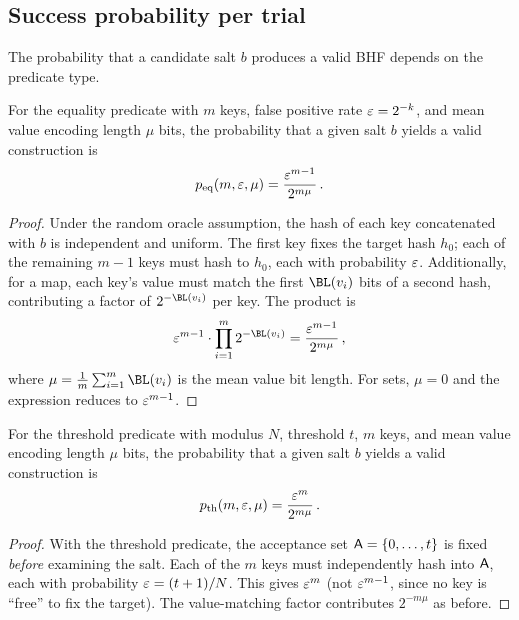 \subsection{Success probability per trial}

The probability that a candidate salt $b$ produces a valid BHF depends on the
predicate type.

\begin{theorem}
\label{thm:success_eq}
For the equality predicate with $m$ keys, false positive rate
$\varepsilon = 2^{-k}$, and mean value encoding length $\mu$ bits, the probability
that a given salt $b$ yields a valid construction is
\begin{equation}
    p_{\mathrm{eq}}(m, \varepsilon, \mu) = \frac{\varepsilon^{m-1}}{2^{m\mu}}\,.
\end{equation}
\end{theorem}
\begin{proof}
Under the random oracle assumption, the hash of each key concatenated with
$b$ is independent and uniform.
The first key fixes the target hash $h_0$; each of the remaining $m-1$ keys
must hash to $h_0$, each with probability $\varepsilon$.
Additionally, for a map, each key's value must match the first $\BL(v_i)$ bits
of a second hash, contributing a factor of $2^{-\BL(v_i)}$ per key.
The product is
\begin{equation}
    \fprate^{m-1} \cdot \prod_{i=1}^{m} 2^{-\BL(v_i)}
    = \frac{\fprate^{m-1}}{2^{m\mu}}\,,
\end{equation}
where $\mu = \frac{1}{m}\sum_{i=1}^{m} \BL(v_i)$ is the mean value bit length.
For sets, $\mu = 0$ and the expression reduces to $\varepsilon^{m-1}$.
\end{proof}

\begin{theorem}
\label{thm:success_thresh}
For the threshold predicate with modulus $N$, threshold $t$, $m$ keys, and mean
value encoding length $\mu$ bits, the probability that a given salt $b$ yields
a valid construction is
\begin{equation}
    p_{\mathrm{th}}(m, \varepsilon, \mu) = \frac{\varepsilon^{m}}{2^{m\mu}}\,.
\end{equation}
\end{theorem}
\begin{proof}
With the threshold predicate, the acceptance set $\Set{A} = \{0,\ldots,t\}$ is
fixed \emph{before} examining the salt.
Each of the $m$ keys must independently hash into $\Set{A}$, each with
probability $\varepsilon = (t+1)/N$.
This gives $\varepsilon^m$ (not $\varepsilon^{m-1}$, since no key is ``free'' to fix
the target).
The value-matching factor contributes $2^{-m\mu}$ as before.
\end{proof}

